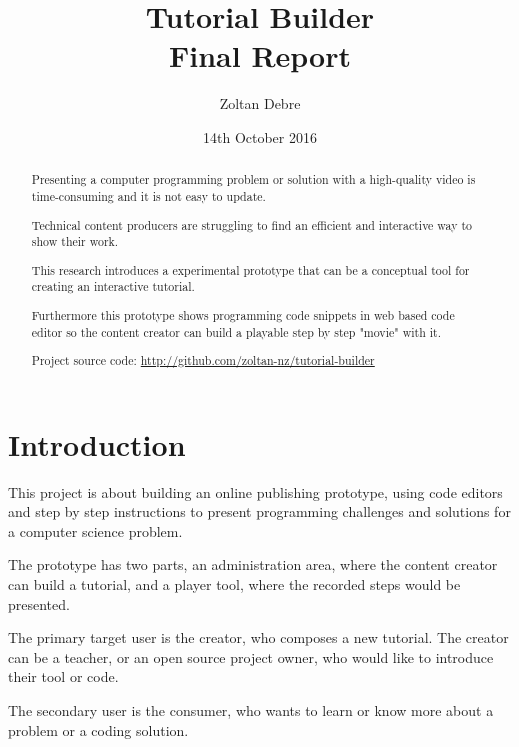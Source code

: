 \documentclass[12pt, a4paper, oneside, openright, medskipamount]{report}
\title{%
Tutorial Builder \\
\large Final Report}
\author{Zoltan Debre}
\date{14th October 2016}
\begin{document}
\frontmatter

\begin{abstract}

Presenting a computer programming problem or solution with a high-quality video is time-consuming and it is not easy to update.

Technical content producers are struggling to find an efficient and interactive way to show their work.

This research introduces a experimental prototype that can be a conceptual tool for creating an interactive tutorial.

Furthermore this prototype shows programming code snippets in web based code editor so the content creator can build a playable step by step "movie" with it.

Project source code: \url{http://github.com/zoltan-nz/tutorial-builder}

\end{abstract}



\maketitle

\tableofcontents


\mainmatter


\chapter{Introduction}

This project is about building an online publishing prototype, using code editors and step by step instructions to present programming challenges and solutions for a computer science problem.

The prototype has two parts, an administration area, where the content creator can build a tutorial, and a player tool, where the recorded steps would be presented.

The primary target user is the creator, who composes a new tutorial. The creator can be a teacher, or an open source project owner, who would like to introduce their tool or code.

The secondary user is the consumer, who wants to learn or know more about a problem or a coding solution.
\end{document}
